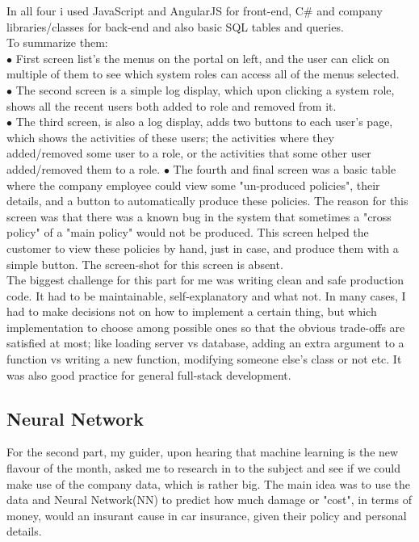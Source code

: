 \documentclass[titlepage, a4paper, 14pt]{extarticle} %
\begin{document}
In all four i used JavaScript and AngularJS for front-end, C\# and company libraries/classes for back-end and also basic SQL tables and queries. \\
To summarize them: \\
$\bullet$ First screen list's the menus on the portal on left, and the user can click on multiple of them to see which system roles can access all of the menus selected. \\
$\bullet$ The second screen is a simple log display, which upon clicking a system role, shows all the recent users both added to role and removed from it. \\
$\bullet$ The third screen, is also a log display, adds two buttons to each user's page, which shows the activities of these users; the activities where they added/removed some user to a role, or the activities that some other user added/removed them to a role.
$\bullet$ The fourth and final screen was a basic table where the company employee could view some "un-produced policies", their details, and a button to automatically produce these policies. The reason for this screen was that there was a known bug in the system that sometimes a "cross policy" of a "main policy" would not be produced. This screen helped the customer to view these policies by hand, just in case, and produce them with a simple button. The screen-shot for this screen is absent.\\

The biggest challenge for this part for me was writing clean and safe production code. It had to be maintainable, self-explanatory and what not. In many cases, I had to make decisions not on how to implement a certain thing, but which implementation to choose among possible ones so that the obvious trade-offs are satisfied at most; like loading server vs database, adding an extra argument to a function vs writing a new function, modifying someone else's class or not etc. It was also good practice for general full-stack development. 



\subsection{Neural Network} \label{neural}

For the second part, my guider, upon hearing that machine learning is the new flavour of the month, asked me to research in to the subject and see if we could make use of the company data, which is rather big. The main idea was to use the data and Neural Network(NN) to predict how much damage or "cost", in terms of money, would an insurant cause in car insurance, given their policy and personal details.\\
\end{document}
